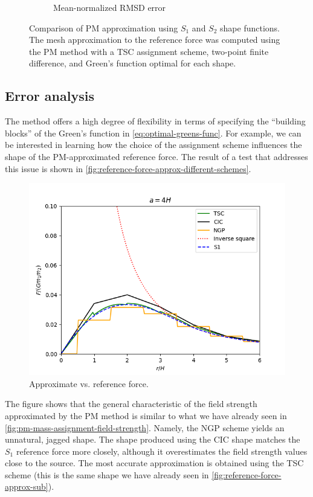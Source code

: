 \begin{figure}[htp]
\begin{subfigure}[b]{0.48\textwidth}
        \caption{Mean-normalized RMSD error}
        \label{fig:reference-force-error-sub}
    \end{subfigure}
    \caption{Comparison of PM approximation using $S_1$ and $S_2$ shape functions.
        The mesh approximation to the reference force was computed using the PM method with a TSC assignment scheme, two-point finite difference, and Green's function optimal for each shape.
    }
    \label{fig:reference-force-combined}
\end{figure}

\subsection{Error analysis}\label{subsec:p3m-error-analysis}
The \PThreeM{} method offers a high degree of flexibility in terms of specifying the ``building blocks'' of the Green's function in \autoref{eq:optimal-greens-func}.
For example, we can be interested in learning how the choice of the assignment scheme influences the shape of the PM-approximated reference force.
The result of a test that addresses this issue is shown in \autoref{fig:reference-force-approx-different-schemes}.
\begin{figure}[htp]
    \centering
    \includegraphics[scale=0.5]{chapters/p3m-method/img/field_different_ass.png}
    \caption{Approximate vs. reference force.}
    \label{fig:reference-force-approx-different-schemes}
\end{figure}
The figure shows that the general characteristic of the field strength approximated by the PM method is similar to what we have already seen in \autoref{fig:pm-mass-assignment-field-strength}.
Namely, the NGP scheme yields an unnatural, jagged shape.
The shape produced using the CIC shape matches the $S_1$ reference force more closely, although it overestimates the field strength values close to the source.
The most accurate approximation is obtained using the TSC scheme (this is the same shape we have already seen in \autoref{fig:reference-force-approx-sub}).


